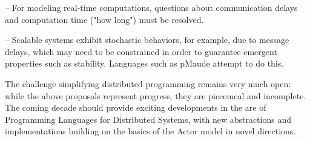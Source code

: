 -- For modeling real-time computations, questions about communication
delays and computation time ("how long") must be resolved.

-- Scalable systems exhibit stochastic behaviors, for example, due to
message delays, which may need to be constrained in order to guarantee
emergent properties such as stability.  Languages such as pMaude
attempt to do this.

The challenge simplifying distributed programming remains very much
open: while the above proposals represent progress, they are piecemeal
and incomplete.  The coming decade should provide exciting
developments in the are of Programming Languages for Distributed
Systems, with new abstractions and implementations building on the
basics of the Actor model in novel directions.
